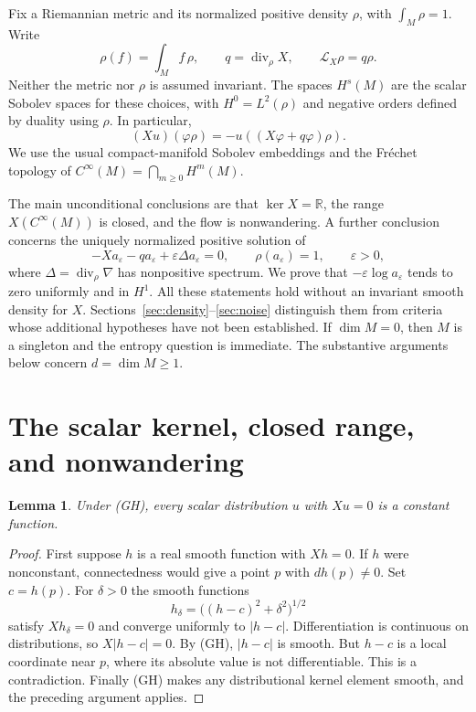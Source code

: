 \documentclass[11pt]{article}
\newtheorem{lemma}[theorem]{Lemma}
\theoremstyle{definition}
\theoremstyle{remark}
\newcommand{\R}{\mathbb R}
\newcommand{\eps}{\varepsilon}
\DeclareMathOperator{\diver}{div}
\begin{document}
Fix a Riemannian metric and its normalized positive density $\rho$, with $\int_M\rho=1$. Write
\[
 \rho(f)=\int_M f\,\rho,\qquad
 q=\diver_\rho X,\qquad \mathcal L_X\rho=q\rho.
\]
Neither the metric nor $\rho$ is assumed invariant. The spaces $H^s(M)$ are the scalar Sobolev spaces for these choices, with $H^0=L^2(\rho)$ and negative orders defined by duality using $\rho$. In particular,
\begin{equation}\label{eq:scalar}
 (Xu)(\varphi\rho)=-u((X\varphi+q\varphi)\rho).
\end{equation}
We use the usual compact-manifold Sobolev embeddings and the Fr\'echet topology of $C^\infty(M)=\bigcap_{m\ge0}H^m(M)$.

The main unconditional conclusions are that $\ker X=\R$, the range $X(C^\infty(M))$ is closed, and the flow is nonwandering. A further conclusion concerns the uniquely normalized positive solution of
\begin{equation}\label{eq:stationary-intro}
 -Xa_\eps-qa_\eps+\eps\Delta a_\eps=0,
 \qquad \rho(a_\eps)=1,\qquad \eps>0,
\end{equation}
where $\Delta=\diver_\rho\nabla$ has nonpositive spectrum. We prove that $-\eps\log a_\eps$ tends to zero uniformly and in $H^1$. All these statements hold without an invariant smooth density for $X$. Sections~\ref{sec:density}--\ref{sec:noise} distinguish them from criteria whose additional hypotheses have not been established. If $\dim M=0$, then $M$ is a singleton and the entropy question is immediate. The substantive arguments below concern $d=\dim M\ge1$.

\section{The scalar kernel, closed range, and nonwandering}
\label{sec:regularity}

\begin{lemma}\label{lem:kernel}
Under (GH), every scalar distribution $u$ with $Xu=0$ is a constant function.
\end{lemma}
\begin{proof}
First suppose $h$ is a real smooth function with $Xh=0$. If $h$ were nonconstant, connectedness would give a point $p$ with $dh(p)\ne0$. Set $c=h(p)$. For $\delta>0$ the smooth functions
\[
 h_\delta=\big((h-c)^2+\delta^2\big)^{1/2}
\]
satisfy $Xh_\delta=0$ and converge uniformly to $|h-c|$. Differentiation is continuous on distributions, so $X|h-c|=0$. By (GH), $|h-c|$ is smooth. But $h-c$ is a local coordinate near $p$, where its absolute value is not differentiable. This is a contradiction. Finally (GH) makes any distributional kernel element smooth, and the preceding argument applies.
\end{proof}
\end{document}
